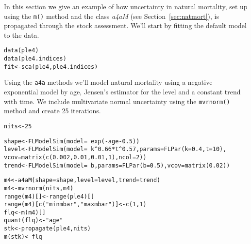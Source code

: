 \documentclass[a4paper,english,10pt]{article}\usepackage[]{graphicx}\usepackage[]{color}
\makeatletter
\newcommand{\hlnum}[1]{\textcolor[rgb]{0.2,0.2,0.2}{#1}}%
\newcommand{\hlstr}[1]{\textcolor[rgb]{0.2,0.2,0.2}{#1}}%
\newcommand{\hlopt}[1]{\textcolor[rgb]{0.2,0.2,0.2}{#1}}%
\newcommand{\hlstd}[1]{\textcolor[rgb]{0,0,0}{#1}}%
\newcommand{\hlkwb}[1]{\textcolor[rgb]{0.361,0.506,0.596}{#1}}%
\newcommand{\hlkwc}[1]{\textcolor[rgb]{0.361,0.506,0.596}{#1}}%
\newcommand{\hlkwd}[1]{\textcolor[rgb]{0.361,0.506,0.596}{#1}}%
\newenvironment{kframe}{%
 \def\at@end@of@kframe{}%
 \ifinner\ifhmode%
  \def\at@end@of@kframe{\end{minipage}}%
  \begin{minipage}{\columnwidth}%
 \fi\fi%
 \def\FrameCommand##1{\hskip\@totalleftmargin \hskip-\fboxsep
 \colorbox{shadecolor}{##1}\hskip-\fboxsep
     \hskip-\linewidth \hskip-\@totalleftmargin \hskip\columnwidth}%
 \MakeFramed {\advance\hsize-\width
   \@totalleftmargin\z@ \linewidth\hsize
   \@setminipage}}%
 {\par\unskip\endMakeFramed%
 \at@end@of@kframe}
\newenvironment{knitrout}{}{} %
\newcommand{\initiative}[1]{{\texttt{#1}}}
\newcommand{\code}[1]{{\texttt{#1}}}
\newcommand{\class}[1]{{\textit{#1}}}
\makeatother
\begin{document}
In this section we give an example of how uncertainty in natural mortality, set up using the \code{m()} method and the class \class{a4aM} (see Section~\ref{sec:natmort}), is propagated through the stock assessment. We'll start by fitting the default model to the data. 

\begin{knitrout}
\color{fgcolor}\begin{kframe}
\begin{alltt}
\hlkwd{data}\hlstd{(ple4)}
\hlkwd{data}\hlstd{(ple4.indices)}
\hlstd{fit} \hlkwb{<-} \hlkwd{sca}\hlstd{(ple4, ple4.indices)}
\end{alltt}
\end{kframe}
\end{knitrout}

Using the \initiative{a4a} methods we'll model natural mortality using a negative exponential model by age, Jensen's estimator for the level and a constant trend with time. We include multivariate normal uncertainty using the \code{mvrnorm()} method and create 25 iterations. 

\begin{knitrout}
\color{fgcolor}\begin{kframe}
\begin{alltt}
\hlstd{nits} \hlkwb{<-} \hlnum{25}

\hlstd{shape} \hlkwb{<-} \hlkwd{FLModelSim}\hlstd{(}\hlkwc{model}\hlstd{=}\hlopt{~}\hlkwd{exp}\hlstd{(}\hlopt{-}\hlstd{age}\hlopt{-}\hlnum{0.5}\hlstd{))}
\hlstd{level} \hlkwb{<-} \hlkwd{FLModelSim}\hlstd{(}\hlkwc{model}\hlstd{=}\hlopt{~}\hlstd{k}\hlopt{^}\hlnum{0.66}\hlopt{*}\hlstd{t}\hlopt{^}\hlnum{0.57}\hlstd{,} \hlkwc{params} \hlstd{=} \hlkwd{FLPar}\hlstd{(}\hlkwc{k}\hlstd{=}\hlnum{0.4}\hlstd{,} \hlkwc{t}\hlstd{=}\hlnum{10}\hlstd{),}
                    \hlkwc{vcov}\hlstd{=}\hlkwd{matrix}\hlstd{(}\hlkwd{c}\hlstd{(}\hlnum{0.002}\hlstd{,} \hlnum{0.01}\hlstd{,}\hlnum{0.01}\hlstd{,} \hlnum{1}\hlstd{),} \hlkwc{ncol}\hlstd{=}\hlnum{2}\hlstd{))}
\hlstd{trend} \hlkwb{<-} \hlkwd{FLModelSim}\hlstd{(}\hlkwc{model}\hlstd{=}\hlopt{~}\hlstd{b,} \hlkwc{params}\hlstd{=}\hlkwd{FLPar}\hlstd{(}\hlkwc{b}\hlstd{=}\hlnum{0.5}\hlstd{),} \hlkwc{vcov}\hlstd{=}\hlkwd{matrix}\hlstd{(}\hlnum{0.02}\hlstd{))}

\hlstd{m4} \hlkwb{<-} \hlkwd{a4aM}\hlstd{(}\hlkwc{shape}\hlstd{=shape,} \hlkwc{level}\hlstd{=level,} \hlkwc{trend}\hlstd{=trend)}
\hlstd{m4} \hlkwb{<-} \hlkwd{mvrnorm}\hlstd{(nits, m4)}
\hlkwd{range}\hlstd{(m4)[]} \hlkwb{<-} \hlkwd{range}\hlstd{(ple4)[]}
\hlkwd{range}\hlstd{(m4)[}\hlkwd{c}\hlstd{(}\hlstr{"minmbar"}\hlstd{,}\hlstr{"maxmbar"}\hlstd{)]}\hlkwb{<-}\hlkwd{c}\hlstd{(}\hlnum{1}\hlstd{,}\hlnum{1}\hlstd{)}
\hlstd{flq} \hlkwb{<-} \hlkwd{m}\hlstd{(m4)[]}
\hlkwd{quant}\hlstd{(flq)} \hlkwb{<-} \hlstr{"age"}
\hlstd{stk} \hlkwb{<-} \hlkwd{propagate}\hlstd{(ple4, nits)}
\hlkwd{m}\hlstd{(stk)} \hlkwb{<-} \hlstd{flq}
\end{alltt}
\end{kframe}
\end{knitrout}
\end{document}
